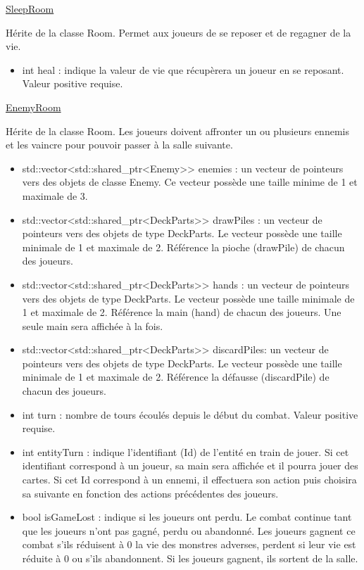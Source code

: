 \underline{SleepRoom}
\par Hérite de la classe Room. Permet aux joueurs de se reposer et de regagner de la vie.
\begin{itemize}
    \item int heal : indique la valeur de vie que récupèrera un joueur en se reposant. Valeur positive requise.
\end{itemize}

\underline{EnemyRoom}
\par Hérite de la classe Room. Les joueurs doivent affronter un ou plusieurs ennemis et les vaincre pour pouvoir passer à la salle suivante.
\begin{itemize}
    \item std::vector<std::shared\_ptr<Enemy>> enemies : un vecteur de pointeurs vers des objets de classe Enemy. Ce vecteur possède une taille minime de 1 et maximale de 3.
    \item std::vector<std::shared\_ptr<DeckParts>> drawPiles : un vecteur de pointeurs vers des objets de type DeckParts. Le vecteur possède une taille minimale de 1 et maximale de 2. Référence la pioche (drawPile) de chacun des joueurs.
    \item std::vector<std::shared\_ptr<DeckParts>> hands : un vecteur de pointeurs vers des objets de type DeckParts. Le vecteur possède une taille minimale de 1 et maximale de 2. Référence la main (hand) de chacun des joueurs. Une seule main sera affichée à la fois.
    \item std::vector<std::shared\_ptr<DeckParts>> discardPiles: un vecteur de pointeurs vers des objets de type DeckParts. Le vecteur possède une taille minimale de 1 et maximale de 2. Référence la défausse (discardPile) de chacun des joueurs.
    \item int turn : nombre de tours écoulés depuis le début du combat. Valeur positive requise.
    \item int entityTurn : indique l'identifiant (Id) de l'entité en train de jouer. Si cet identifiant correspond à un joueur, sa main sera affichée et il pourra jouer des cartes. Si cet Id correspond à un ennemi, il effectuera son action puis choisira sa suivante en fonction des actions précédentes des joueurs.
    \item bool isGameLost : indique si les joueurs ont perdu. Le combat continue tant que les joueurs n'ont pas gagné, perdu ou abandonné. Les joueurs gagnent ce combat s'ils réduisent à 0 la vie des monstres adverses, perdent si leur vie est réduite à 0 ou s'ils abandonnent. Si les joueurs gagnent, ils sortent de la salle.

\end{itemize}


